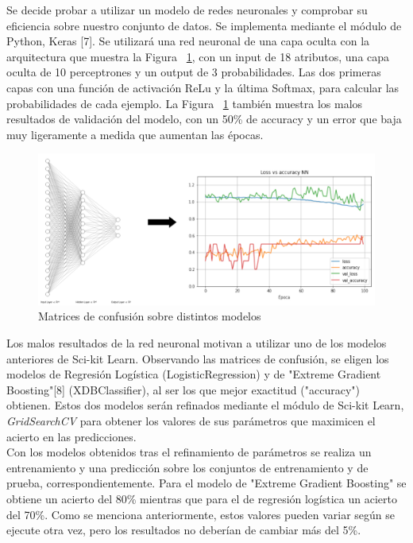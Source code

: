\documentclass{esannV2}
\begin{document}
Se decide probar a utilizar un modelo de redes neuronales y comprobar su eficiencia sobre nuestro conjunto de datos. Se implementa mediante el módulo de Python, Keras [7]. Se utilizará una red neuronal de una capa oculta con la arquitectura que muestra la Figura ~\ref{fig:nn}, con un input de 18 atributos, una capa oculta de 10 perceptrones y un output de 3 probabilidades. Las dos primeras capas con una función de activación ReLu y la última Softmax, para calcular las probabilidades de cada ejemplo. La Figura ~\ref{fig:nn} también muestra los malos resultados de validación del modelo, con un 50\% de accuracy y un error que baja muy ligeramente a medida que aumentan las épocas.   \\

\begin{figure}[b!]
\centering
\includegraphics[scale=0.3]{img/nn.png}
\caption{Matrices de confusión sobre distintos modelos}\label{fig:nn}
\end{figure}

Los malos resultados de la red neuronal motivan a utilizar uno de los modelos anteriores de Sci-kit Learn. Observando las matrices de confusión, se eligen los modelos de Regresión Logística (LogisticRegression) y de "Extreme Gradient Boosting"[8]  (XDBClassifier), al ser los que mejor exactitud ("accuracy") obtienen. Estos dos modelos serán refinados mediante el módulo de Sci-kit Learn, \textit{GridSearchCV} para obtener los valores de sus parámetros  que maximicen el acierto en las predicciones. \\
Con los modelos obtenidos tras el refinamiento de parámetros se realiza un entrenamiento y una predicción sobre los conjuntos de entrenamiento y de prueba, correspondientemente. Para el modelo de "Extreme Gradient Boosting" se obtiene un acierto del 80\% mientras que para el de regresión logística un acierto del 70\%. Como se menciona anteriormente, estos valores pueden variar según se ejecute otra vez, pero los resultados no deberían de cambiar más del 5\%. 
\end{document}
